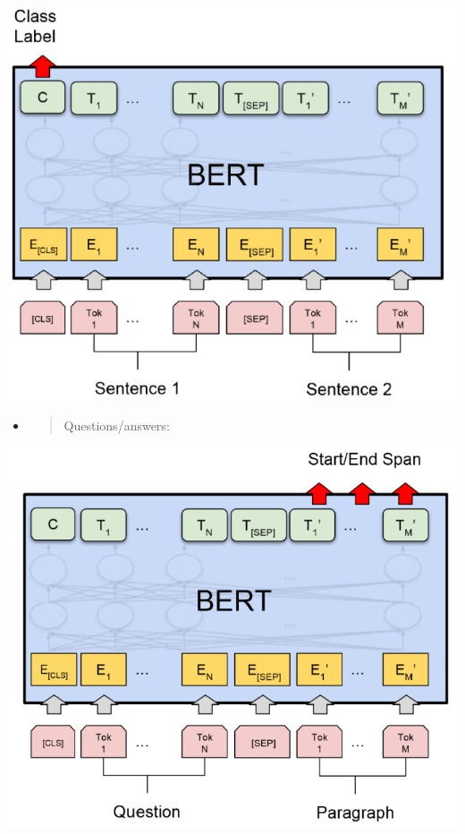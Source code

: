 \includegraphics[width=\columnwidth]{media/image19.png}

\begin{itemize}
\item
  \begin{quote}
  Questions/answers:
  \end{quote}
\end{itemize}

\includegraphics[width=\columnwidth]{media/image37.png}

